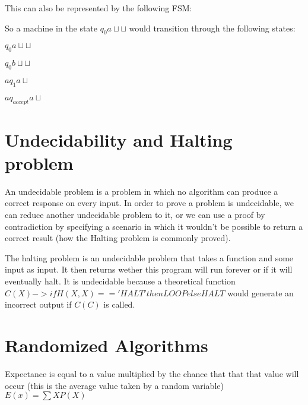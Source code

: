\documentclass{article}
\begin{document}
This can also be represented by the following FSM:

\begin{multicols}{2}
    


\columnbreak

So a machine in the state $q_0 a \sqcup\sqcup$ would transition through the following states:

$q_0 a \sqcup\sqcup$

$q_0 b \sqcup\sqcup$

$a q_1 a\sqcup$

$a q_{accept} a\sqcup$

\end{multicols}

\section{Undecidability and Halting problem}
An undecidable problem is a problem in which no algorithm can produce a correct response on every
input. In order to prove a problem is undecidable, we can reduce another undecidable problem to it, 
or we can use a proof by contradiction by specifying a scenario in which it wouldn't be possible
to return a correct result (how the Halting problem is commonly proved).

The halting problem is an undecidable problem that takes a function and some input as input. It then returns
wether this program will run forever or if it will eventually halt. It is undecidable because a theoretical
function $C(X) -> if H(X,X) == 'HALT' then LOOP else HALT$ would generate an incorrect output if $C(C)$ is called.


\section{Randomized Algorithms}
Expectance is equal to a value multiplied by the chance that that that value will occur
(this is the average value taken by a random variable)$E(x) = \sum XP(X)$
\end{document}
